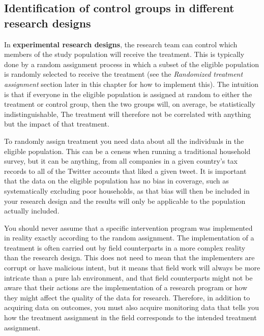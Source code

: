 \subsection{Identification of control groups in different research designs}


In \textbf{experimental research designs},
 
the research team can control which members
of the study population will receive the treatment.
This is typically done by a random assignment process
in which a subset of the eligible population
is randomly selected to receive the treatment
(see the \textit{Randomized treatment assignment} section 
later in this chapter for how to implement this).
The intuition is that if everyone in the eligible population
is assigned at random to either the treatment or control group,
then the two groups will, on average, be statistically indistinguishable,
The treatment will therefore not be correlated with anything 
but the impact of that treatment.\cite{duflo2007using}

To randomly assign treatment you need data
about all the individuals in the eligible population.
This can be a census when running a traditional household survey,
but it can be anything, from all companies in a given country's tax records
to all of the Twitter accounts that liked a given tweet.
It is important that the data on the eligible population has no bias in coverage,
such as systematically excluding poor households,
as that bias will then be included in your research design
and the results will only be applicable to the population actually included.

You should never assume that a specific intervention program
was implemented in reality exactly according to the random assignment.
The implementation of a treatment is often carried out
by field counterparts in a more complex reality than the research design.
This does not need to mean that the implementers are corrupt or have malicious intent,
but it means that field work will always be more intricate than a pure lab environment,
and that field counterparts might not be aware
that their actions are the implementation of a research program
or how they might affect the quality of the data for research.
Therefore, in addition to acquiring data on outcomes,
you must also acquire monitoring data
that tells you how the treatment assignment in the field
corresponds to the intended treatment assignment.

